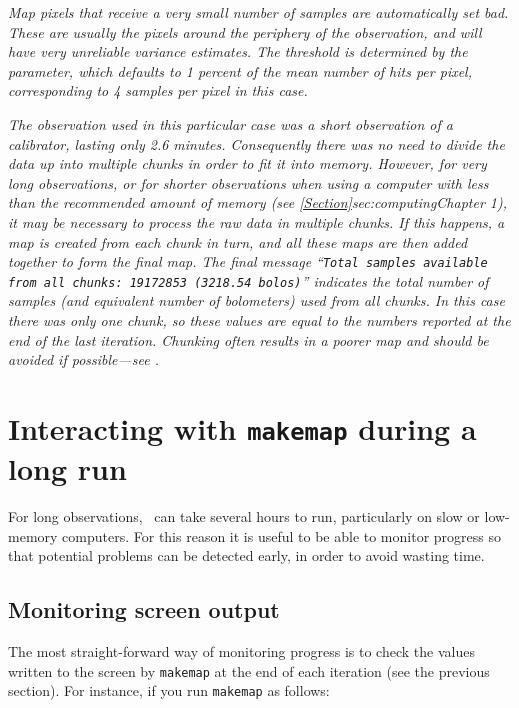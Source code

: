 \begin{terminalv}
\emph{Map pixels that receive a very small number of samples are automatically
set bad. These are usually the pixels around the periphery of the
observation, and will have very unreliable variance estimates. The
threshold is determined by the  parameter,
which defaults to 1 percent of the mean number of hits per pixel,
corresponding to 4 samples per pixel in this case.}

\emph{The observation used in this particular case was a short
observation of a calibrator, lasting only 2.6 minutes. Consequently there
was no need to divide the data up into multiple chunks in order to fit it
into memory.  However, for very long observations, or for shorter
observations when using a computer with less than the recommended amount
of memory (see \cref{Section}{sec:computing}{Chapter 1}), it may be
necessary to process the raw data in multiple chunks. If this happens, a
map is created from each chunk in turn, and all these maps are then added
together to form the final map.  The final message ``\texttt{Total
samples available from all chunks: 19172853 (3218.54 bolos)}'' indicates
the total number of samples (and equivalent number of bolometers) used
from all chunks. In this case there was only one chunk, so these values
are equal to the numbers reported at the end of the last iteration.
Chunking often results in a poorer map and should be avoided
if possible---see 
{}.}

\section{Interacting with \texttt{makemap} during a long run}
For long observations, \makemap\ can take several hours to run,
particularly on slow or low-memory computers. For this reason it is
useful to be able to monitor progress so that potential problems can be
detected early, in order to avoid wasting time.

\subsection{Monitoring screen output}
The most straight-forward way of monitoring progress is to check the
values written to the screen by \texttt{makemap} at the end of each iteration (see
the previous section). For instance, if you run \texttt{makemap} as follows:

\begin{terminalv}
\end{terminalv}


\end{terminalv}
